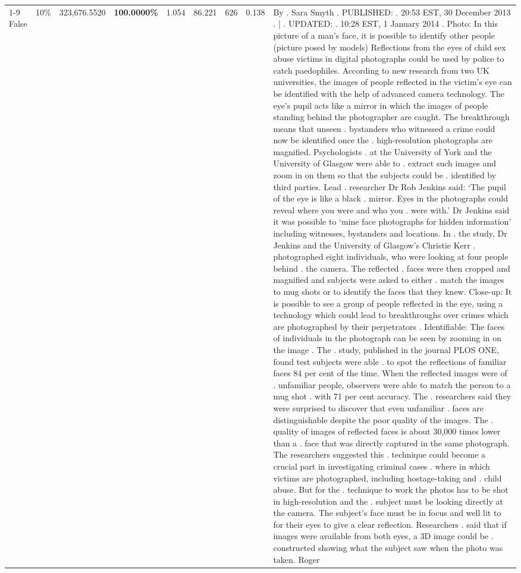 \begin{table}[H]
\begin{tabular}{lllrlllll}
\cline{1-9} \cline{2-9}
False & 10\% & 323,676.5520 & \bfseries \color{red} 100.0000\% & 1.054 & 86.221 & 626 & 0.138 & By . Sara Smyth . PUBLISHED: . 20:53 EST, 30 December 2013 . | . UPDATED: . 10:28 EST, 1 January 2014 . Photo: In this picture of a man's face, it is possible to identify other people (picture posed by models) Reflections from the eyes of child sex abuse victims in digital photographs could be used by police to catch paedophiles. According to new research from two UK universities, the images of people reflected in the victim's eye can be identified with the help of advanced camera technology. The eye's pupil acts like a mirror in which the images of people standing behind the photographer are caught. The breakthrough means that unseen . bystanders who witnessed a crime could now be identified once the . high-resolution photographs are magnified. Psychologists . at the University of York and the University of Glasgow were able to . extract such images and zoom in on them so that the subjects could be . identified by third parties. Lead . researcher Dr Rob Jenkins said: ‘The pupil of the eye is like a black . mirror. Eyes in the photographs could reveal where you were and who you . were with.' Dr Jenkins said it was possible to ‘mine face photographs for hidden information' including witnesses, bystanders and locations. In . the study, Dr Jenkins and the University of Glasgow's Christie Kerr . photographed eight individuals, who were looking at four people behind . the camera. The reflected . faces were then cropped and magnified and subjects were asked to either . match the images to mug shots or to identify the faces that they knew. Close-up: It is possible to see a group of people reflected in the eye, using a technology which could lead to breakthroughs over crimes which are photographed by their perpetrators . Identifiable: The faces of individuals in the photograph can be seen by zooming in on the image . The . study, published in the journal PLOS ONE, found test subjects were able . to spot the reflections of familiar faces 84 per cent of the time. When the reflected images were of . unfamiliar people, observers were able to match the person to a mug shot . with 71 per cent accuracy. The . researchers said they were surprised to discover that even unfamiliar . faces are distinguishable despite the poor quality of the images. The . quality of images of reflected faces is about 30,000 times lower than a . face that was directly captured in the same photograph. The researchers suggested this . technique could become a crucial part in investigating criminal cases . where in which victims are photographed, including hostage-taking and . child abuse. But for the . technique to work the photos has to be shot in high-resolution and the . subject must be looking directly at the camera. The subject's face must be in focus and well lit to for their eyes to give a clear reflection. Researchers . said that if images were available from both eyes, a 3D image could be . constructed showing what the subject saw when the photo was taken. Roger \\

\end{tabular}
\end{table}
